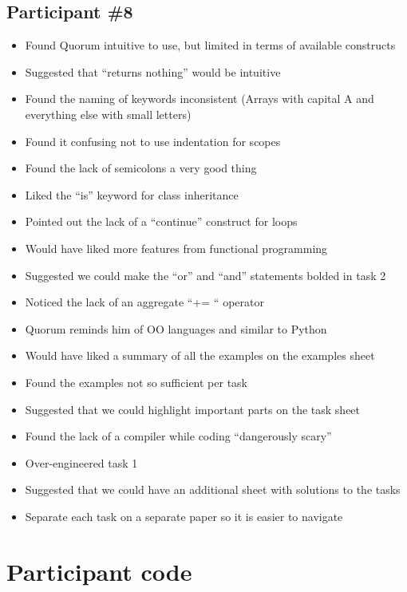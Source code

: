 \section{Participant {\#}8}
\begin{itemize}
\item Found Quorum intuitive to use, but limited in terms of available constructs
\item Suggested that “returns nothing” would be intuitive
\item Found the naming of keywords inconsistent (Arrays with capital A and everything else with small letters)
\item Found it confusing not to use indentation for scopes
\item Found the lack of semicolons a very good thing
\item Liked the “is” keyword for class inheritance
\item Pointed out the lack of a “continue” construct for loops
\item Would have liked more features from functional programming
\item Suggested we could make the “or” and “and” statements bolded in task 2
\item Noticed the lack of an aggregate “+= “ operator
\item Quorum reminds him of OO languages and similar to Python
\item Would have liked a summary of all the examples on the examples sheet
\item Found the examples not so sufficient per task
\item Suggested that we could highlight important parts on the task sheet 
\item Found the lack of a compiler while coding “dangerously scary”
\item Over-engineered task 1 
\item Suggested that we could have an additional sheet with solutions to the tasks
\item Separate each task on a separate paper so it is easier to navigate 
\end{itemize}
\chapter{Participant code}

